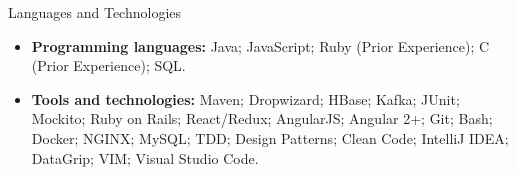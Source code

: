 \documentclass[calibri]{../macdowell-cv/mcdowellcv}
\begin{document}
	\begin{cvsection}{Languages and Technologies}
		\begin{cvsubsection}{}{}{}	
			\begin{itemize}
				\item \textbf{Programming languages:} Java; JavaScript; Ruby (Prior Experience); C (Prior Experience); SQL.
				\item \textbf{Tools and technologies:} Maven; Dropwizard; HBase; Kafka; JUnit; Mockito; Ruby on Rails; React/Redux; AngularJS; Angular 2+; Git; Bash; Docker; NGINX; MySQL; TDD; Design Patterns; Clean Code; IntelliJ IDEA; DataGrip; VIM; Visual Studio Code.
			\end{itemize}
		\end{cvsubsection}
	\end{cvsection}
	
\end{document}
